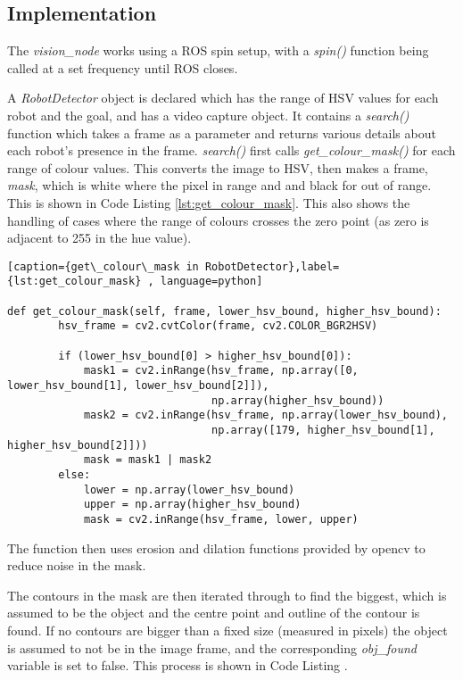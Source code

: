 \subsection{Implementation}\label{soft/cv/impl}
The \textit{vision\_node} works using a ROS spin setup, with a \textit{spin()} function being called at a set frequency until ROS closes. 

A \textit{RobotDetector} object is declared which has the range of HSV values for each robot and the goal, and has a video capture object. It contains a \textit{search()} function which takes a frame as a parameter and returns various details about each robot's presence in the frame. \textit{search()} first calls \textit{get\_colour\_mask()} for each range of colour values. This converts the image to HSV, then makes a frame, \textit{mask}, which is white where the pixel in range and and black for out of range. This is shown in Code Listing \ref{lst:get_colour_mask}. This also shows the handling of cases where the range of colours crosses the zero point (as zero is adjacent to 255 in the hue value).

\begin{lstlisting}[caption={get\_colour\_mask in RobotDetector},label={lst:get_colour_mask} , language=python]

def get_colour_mask(self, frame, lower_hsv_bound, higher_hsv_bound):
        hsv_frame = cv2.cvtColor(frame, cv2.COLOR_BGR2HSV)

        if (lower_hsv_bound[0] > higher_hsv_bound[0]):
            mask1 = cv2.inRange(hsv_frame, np.array([0, lower_hsv_bound[1], lower_hsv_bound[2]]),
                                np.array(higher_hsv_bound))
            mask2 = cv2.inRange(hsv_frame, np.array(lower_hsv_bound),
                                np.array([179, higher_hsv_bound[1], higher_hsv_bound[2]]))
            mask = mask1 | mask2
        else:
            lower = np.array(lower_hsv_bound)
            upper = np.array(higher_hsv_bound)
            mask = cv2.inRange(hsv_frame, lower, upper)

\end{lstlisting}

The function then uses erosion and dilation functions provided by opencv to reduce noise in the mask. 

The contours in the mask are then iterated through to find the biggest, which is assumed to be the object and the centre point and outline of the contour is found. If no contours are bigger than a fixed size (measured in pixels) the object is assumed to not be in the image frame, and the corresponding \textit{obj\_found} variable is set to false. This process is shown in Code Listing \cite{lst:cv_search_loop}.

